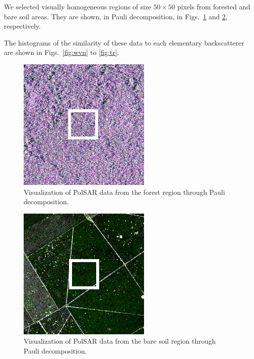 \documentclass[conference]{IEEEtran}
\begin{document}
We selected visually homogeneous regions of size $50\times50$ pixels from forested and bare soil areas.
They are shown, in Pauli decomposition, in Figs.~\ref{fig:forest} and \ref{fig:bare_soil}, respectively.



The histograms of the similarity of these data to each elementary backscatterer are shown in Figs.~\ref{fig:wvn} to \ref{fig:tr}.


\begin{figure}[hbt]
    \vspace{.1\linewidth}
    \centering
    \includegraphics[width = .7\linewidth]{forest}
    \caption{Visualization of PolSAR data from the forest region through Pauli decomposition.}
    \label{fig:forest}
\end{figure}

\begin{figure}[hbt]
    \vspace{.1\linewidth}
    \centering
    \includegraphics[width = .7\linewidth]{bare_soil.png}
    \caption{Visualization of PolSAR data from the bare soil region through Pauli decomposition.}
    \label{fig:bare_soil}
\end{figure}
\end{document}

